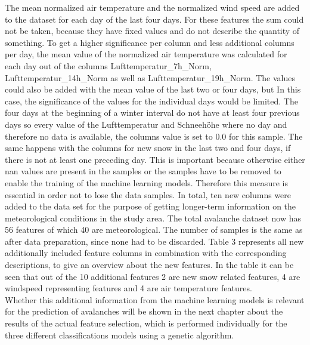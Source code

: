 \documentclass[../masterarbeit.tex]{subfiles}
\begin{document}
The mean normalized air temperature and the normalized wind speed are added to the dataset for each day of the last four days. For these features the sum could not be taken, because they have fixed values and do not describe the quantity of something. To get a higher significance per column and less additional columns per day, the mean value of the normalized air temperature was calculated for each day out of the columns Lufttemperatur\_7h\_Norm, Lufttemperatur\_14h\_Norm as well as Lufttemperatur\_19h\_Norm.  The values could also be added with the mean value of the last two or four days, but In this case, the significance of the values for the individual days would be limited. The four days at the beginning of a winter interval do not have at least four previous days so every value of the Lufttemperatur and Schneehöhe where no day and therefore no data is available, the columns value is set to 0.0 for this sample. The same happens with the columns for new snow in the last two and four days, if there is not at least one preceding day. This is important because otherwise either nan values are present in the samples or the samples have to be removed to enable the training of the machine learning models. Therefore this measure is essential in order not to lose the data samples.
In total, ten new columns were added to the data set for the purpose of getting longer-term information on the meteorological conditions in the study area. The total avalanche dataset now has 56 features of which 40 are meteorological. The number of samples is the same as after data preparation, since none had to be discarded. Table 3 represents all new additionally included feature columns in combination with the corresponding descriptions, to give an overview about the new features. In the table it can be seen that out of the 10 additional features 2 are new snow related features, 4 are windspeed representing features and 4 are air temperature features.\\
Whether this additional information from the machine learning models is relevant for the prediction of avalanches will be shown in the next chapter about the results of the actual feature selection, which is performed individually for the three different classifications models using a genetic algorithm.
\end{document}
